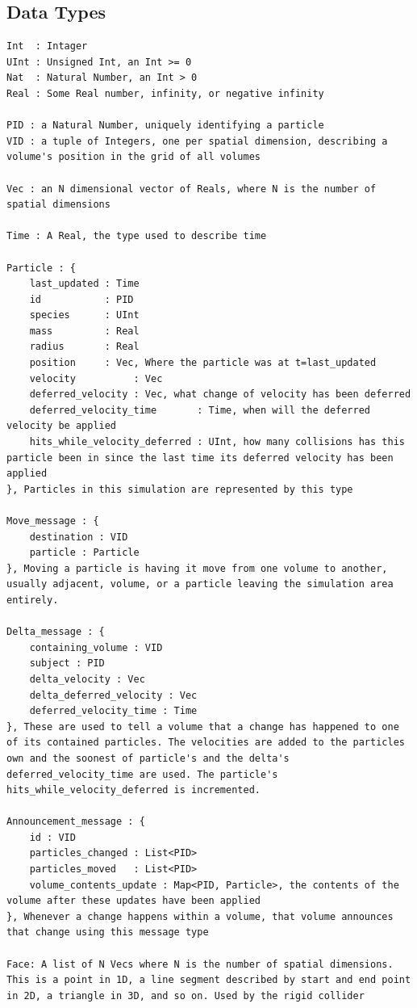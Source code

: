 \documentclass[conference]{IEEEtran}
\begin{document}
\subsection{Data Types}
\begin{lstlisting}
Int  : Intager
UInt : Unsigned Int, an Int >= 0
Nat  : Natural Number, an Int > 0
Real : Some Real number, infinity, or negative infinity

PID : a Natural Number, uniquely identifying a particle
VID : a tuple of Integers, one per spatial dimension, describing a volume's position in the grid of all volumes

Vec : an N dimensional vector of Reals, where N is the number of spatial dimensions

Time : A Real, the type used to describe time

Particle : {
	last_updated : Time
	id           : PID
	species      : UInt
	mass         : Real
	radius       : Real
	position     : Vec, Where the particle was at t=last_updated
	velocity          : Vec
	deferred_velocity : Vec, what change of velocity has been deferred
	deferred_velocity_time       : Time, when will the deferred velocity be applied
	hits_while_velocity_deferred : UInt, how many collisions has this particle been in since the last time its deferred velocity has been applied
}, Particles in this simulation are represented by this type

Move_message : {
	destination : VID
	particle : Particle
}, Moving a particle is having it move from one volume to another, usually adjacent, volume, or a particle leaving the simulation area entirely.

Delta_message : {
	containing_volume : VID
	subject : PID
	delta_velocity : Vec
	delta_deferred_velocity : Vec
	deferred_velocity_time : Time
}, These are used to tell a volume that a change has happened to one of its contained particles. The velocities are added to the particles own and the soonest of particle's and the delta's deferred_velocity_time are used. The particle's hits_while_velocity_deferred is incremented.

Announcement_message : {
	id : VID
	particles_changed : List<PID>
	particles_moved   : List<PID>
	volume_contents_update : Map<PID, Particle>, the contents of the volume after these updates have been applied
}, Whenever a change happens within a volume, that volume announces that change using this message type

Face: A list of N Vecs where N is the number of spatial dimensions. This is a point in 1D, a line segment described by start and end point in 2D, a triangle in 3D, and so on. Used by the rigid collider

\end{lstlisting}
\end{document}
